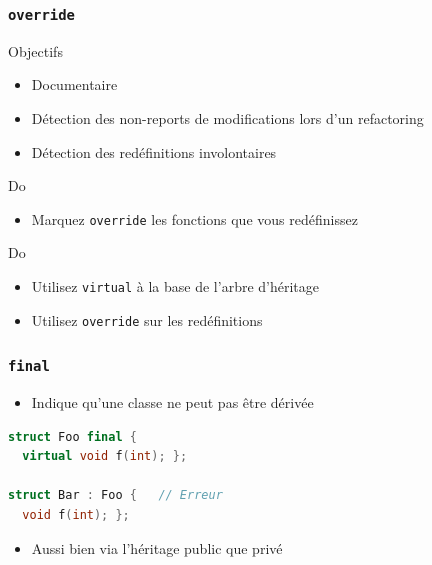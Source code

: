 \documentclass[C++.tex]{subfiles}
\begin{document}
\begin{frame}[fragile]
	\frametitle{\lstinline|override|}
	\begin{block}{Objectifs}
		\begin{itemize}
			\item Documentaire
			\item Détection des non-reports de modifications lors d'un refactoring
			\item Détection des redéfinitions involontaires
		\end{itemize}
	\end{block}

	\begin{exampleblock}{Do}
		\begin{itemize}
			\item Marquez \lstinline|override| les fonctions que vous redéfinissez
		\end{itemize}
	\end{exampleblock}

	\begin{exampleblock}{Do}
		\begin{itemize}
			\item Utilisez \lstinline|virtual| à la base de l'arbre d'héritage
			\item Utilisez \lstinline|override| sur les redéfinitions
		\end{itemize}

	\end{exampleblock}
\end{frame}

\begin{frame}[fragile]
	\frametitle{\lstinline|final|}
	\begin{itemize}
		\item Indique qu'une classe ne peut pas être dérivée
	\end{itemize}

	\begin{lstlisting}[language=C++]
struct Foo final {
  virtual void f(int); };

struct Bar : Foo {   // Erreur
  void f(int); };
\end{lstlisting}

	\begin{itemize}
		\item Aussi bien via l'héritage public que privé
	\end{itemize}
\end{frame}
\end{document}

